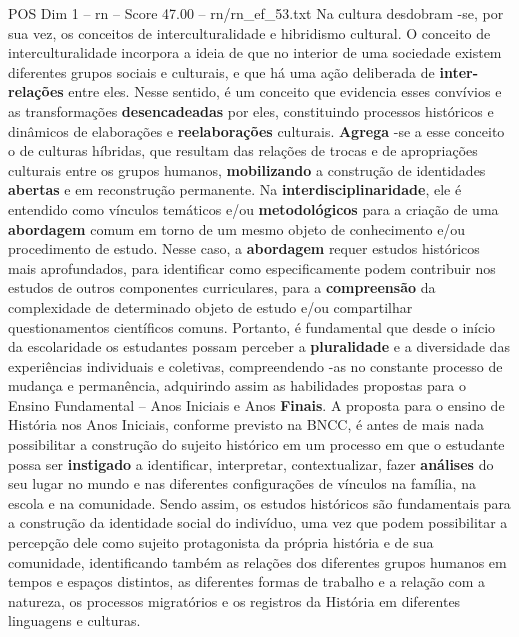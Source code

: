 \begin{textsample}{POS Dim 1 – rn – Score 47.00 – rn/rn\_ef\_53.txt}
Na cultura desdobram -se, por sua vez, os conceitos de interculturalidade e hibridismo cultural.
O conceito de interculturalidade incorpora a ideia de que no interior de uma sociedade existem diferentes grupos sociais e culturais, e que há uma ação deliberada de \textbf{inter-relações} entre eles.
Nesse sentido, é um conceito que evidencia esses convívios e as transformações \textbf{desencadeadas} por eles, constituindo processos históricos e dinâmicos de elaborações e \textbf{reelaborações} culturais. \textbf{Agrega} -se a esse conceito o de culturas híbridas, que resultam das relações de trocas e de apropriações culturais entre os grupos humanos, \textbf{mobilizando} a construção de identidades \textbf{abertas} e em reconstrução permanente.
Na \textbf{interdisciplinaridade}, ele é entendido como vínculos temáticos e/ou \textbf{metodológicos} para a criação de uma \textbf{abordagem} comum em torno de um mesmo objeto de conhecimento e/ou procedimento de estudo.
Nesse caso, a \textbf{abordagem} requer estudos históricos mais aprofundados, para identificar como especificamente podem contribuir nos estudos de outros componentes curriculares, para a \textbf{compreensão} da complexidade de determinado objeto de estudo e/ou compartilhar questionamentos científicos comuns.
Portanto, é fundamental que desde o início da escolaridade os estudantes possam perceber a \textbf{pluralidade} e a diversidade das experiências individuais e coletivas, compreendendo -as no constante processo de mudança e permanência, adquirindo assim as habilidades propostas para o Ensino Fundamental – Anos Iniciais e Anos \textbf{Finais}.
A proposta para o ensino de História nos Anos Iniciais, conforme previsto na BNCC, é antes de mais nada possibilitar a construção do sujeito histórico em um processo em que o estudante possa ser \textbf{instigado} a identificar, interpretar, contextualizar, fazer \textbf{análises} do seu lugar no mundo e nas diferentes configurações de vínculos na família, na escola e na comunidade.
Sendo assim, os estudos históricos são fundamentais para a construção da identidade social do indivíduo, uma vez que podem possibilitar a percepção dele como sujeito protagonista da própria história e de sua comunidade, identificando também as relações dos diferentes grupos humanos em tempos e espaços distintos, as diferentes formas de trabalho e a relação com a natureza, os processos migratórios e os registros da História em diferentes linguagens e culturas.

\end{textsample}
